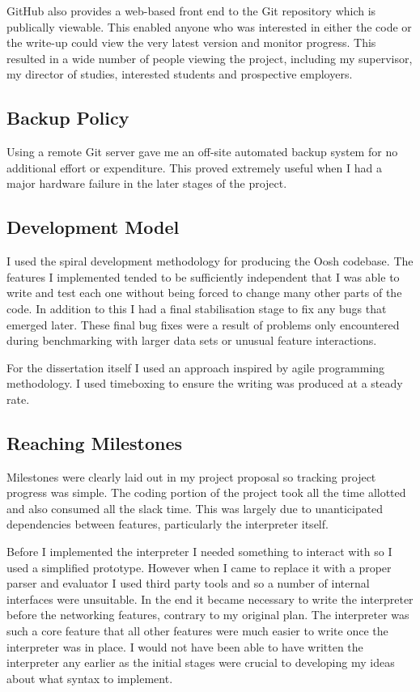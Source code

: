 \documentclass[12pt,twoside,notitlepage]{report}
\begin{document}
GitHub also provides a web-based front end to the Git repository which
is publically viewable. This enabled anyone who was interested in
either the code or the write-up could view the very latest version and
monitor progress. This resulted in a wide number of people viewing the
project, including my supervisor, my director of studies, interested
students and prospective employers.

\subsection{Backup Policy}

Using a remote Git server gave me an off-site automated backup system
for no additional effort or expenditure. This proved extremely useful
when I had a major hardware failure in the later stages of the
project.

\subsection{Development Model}

I used the spiral development methodology for producing the Oosh
codebase. The features I implemented tended to be sufficiently
independent that I was able to write and test each one without being
forced to change many other parts of the code. In addition to this I
had a final stabilisation stage to fix any bugs that emerged
later. These final bug fixes were a result of problems only
encountered during benchmarking with larger data sets or unusual
feature interactions.

For the dissertation itself I used an approach inspired by agile
programming methodology. I used timeboxing to ensure the writing was
produced at a steady rate.

\subsection{Reaching Milestones}

Milestones were clearly laid out in my project proposal so tracking
project progress was simple. The coding portion of the project took
all the time allotted and also consumed all the slack time. This was
largely due to unanticipated dependencies between features,
particularly the interpreter itself. 

Before I implemented the interpreter I needed something to interact
with so I used a simplified prototype. However when I came to replace
it with a proper parser and evaluator I used third party tools and so
a number of internal interfaces were unsuitable. In the end it became
necessary to write the interpreter before the networking features,
contrary to my original plan. The interpreter was such a core feature
that all other features were much easier to write once the interpreter
was in place. I would not have been able to have written the
interpreter any earlier as the initial stages were crucial to
developing my ideas about what syntax to implement.
\end{document}
